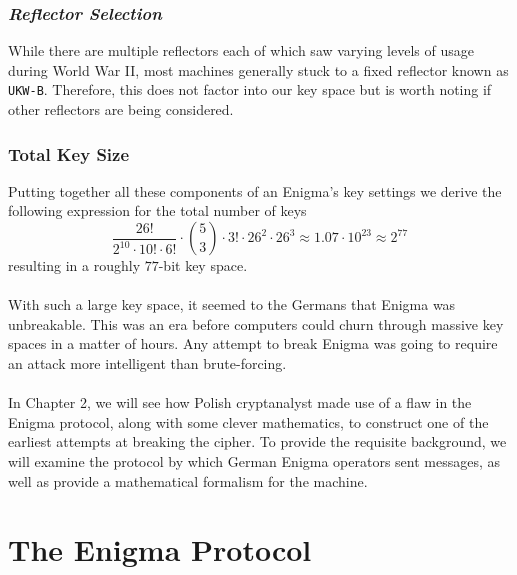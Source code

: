 \subsubsection{\emph{Reflector Selection}}
While there are multiple reflectors each of which saw varying levels
of usage during World War II, most machines generally stuck to a
fixed reflector known as \texttt{UKW-B}. Therefore, this does not
factor into our key space but is worth noting if other reflectors are
being considered.

\subsubsection{Total Key Size}
Putting together all these components of an Enigma's key settings we
derive the following expression for the total number of keys
\[
  \frac{26!}{2^{10}\cdot 10! \cdot 6!}\cdot{5\choose 3}\cdot3!\cdot
  26^2\cdot 26^3 \approx 1.07 \cdot 10^{23} \approx 2^{77}
\]
resulting in a roughly $77$-bit key space.
\\\\With such a large key space, it seemed to the Germans that Enigma
was unbreakable. This was an era before computers could churn through
massive key spaces in a matter of hours. Any attempt to break Enigma
was going to require an attack more intelligent than brute-forcing.
\\\\In Chapter 2, we will see how Polish cryptanalyst made use of a
flaw in the Enigma protocol, along with some clever mathematics, to
construct one of the earliest attempts at breaking the cipher. To
provide the requisite background, we will examine the protocol by
which German Enigma operators sent messages, as well as provide a
mathematical formalism for the machine.

\section{The Enigma Protocol}\label{protocol}

